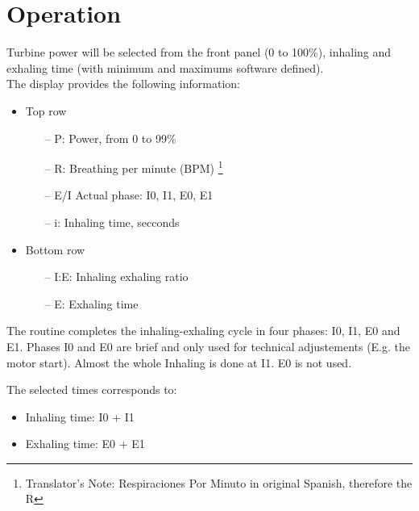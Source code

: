 \section{Operation}
    Turbine power will be selected from the front panel (0 to 100\%), inhaling and exhaling time (with minimum and maximums software defined).\\
    
    The display provides the following information:
    \begin{itemize}
        \item Top row
        \begin{itemize}
            \item[--] P: Power, from 0 to 99\%
            \item[--] R: Breathing per minute (BPM) \footnote{Translator's Note: Respiraciones Por Minuto in original Spanish, therefore the R}
            \item[--] E/I Actual phase: I0, I1, E0, E1
            \item[--] i: Inhaling time, secconds
        \end{itemize}
        \item Bottom row
        \begin{itemize}
            \item[--] I:E: Inhaling exhaling ratio
            \item[--] E: Exhaling time
        \end{itemize}
    \end{itemize}
    
    The routine completes the inhaling-exhaling cycle in four phases: I0, I1, E0 and E1. Phases I0 and E0 are brief and only used for technical adjustements (E.g. the motor start). Almost the whole Inhaling is done at I1. E0 is not used.
    
    The selected times corresponds to:
    \begin{itemize}
        \item Inhaling time: I0 + I1
        \item Exhaling time: E0 + E1
    \end{itemize}
    

